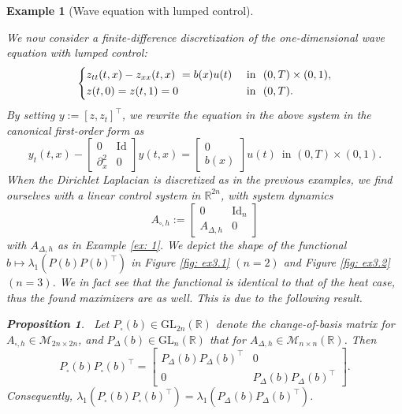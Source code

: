 \documentclass[11pt, a4paper, reqno]{amsart}
\newcommand{\del}{\partial}
\newcommand{\R}{\mathbb{R}}
\theoremstyle{plain}
\numberwithin{equation}{section}
\newtheorem{proposition}{Proposition}[section]
\newtheorem{example}{Example}[section]
\begin{document}
	\begin{example}[Wave equation with lumped control] \label{ex: 3}
	
	We now consider a finite-difference discretization of the one-dimensional wave equation with lumped control: 
	\begin{equation*}
	\begin{dcases}
	z_{tt}(t,x) - z_{xx}(t,x) = b(x)u(t) &\text{ in } (0,T)\times(0,1),\\
	z(t,0) = z(t,1) = 0 &\text{ in } (0,T).
	\end{dcases}	
	\end{equation*}
	By setting $y:=[z, z_t]^\top$, we rewrite the equation in the above system in the canonical first-order form as
	\begin{equation*}
	y_t(t,x) - \begin{bmatrix}0&\mathrm{Id}\\ \del_x^2&0\end{bmatrix}y(t,x) = \begin{bmatrix}0\\b(x)\end{bmatrix} u(t) \, \text{ in } (0,T)\times(0,1).
	\end{equation*}
	When the Dirichlet Laplacian is discretized as in the previous examples, we find ourselves with a linear control system in $\R^{2n}$, with system dynamics
	\begin{equation*}
	A_{\square, h}:= \begin{bmatrix} 0&\mathrm{Id}_n\\
						      A_{\Delta,h}&0
	\end{bmatrix}
	\end{equation*}
	with $A_{\Delta, h}$ as in Example \ref{ex: 1}. We depict the shape of the functional $b\mapsto \lambda_1(P(b)P(b)^\top)$ in Figure \ref{fig: ex3.1} $(n=2)$ and Figure \ref{fig: ex3.2} $(n=3)$. 
	We in fact see that the functional is identical to that of the heat case, thus the found maximizers are as well. This is due to the following result.
	
	\begin{proposition} \label{prop: wave=heat} Let $P_{\square}(b)\in\mathrm{GL}_{2n}(\R)$ denote the change-of-basis matrix for $A_{\square,h}\in\mathcal{M}_{2n\times 2n}$, and $P_{\Delta}(b)\in\mathrm{GL}_n(\R)$ that for $A_{\Delta,h}\in\mathcal{M}_{n\times n}(\R)$. Then 
	\begin{equation}
	P_\square(b)P_\square(b)^\top = \begin{bmatrix} P_{\Delta}(b)P_{\Delta}(b)^\top & 0\\ 0 & P_{\Delta}(b)P_{\Delta}(b)^\top\end{bmatrix}.
	\end{equation}
	Consequently, $\lambda_1\left(P_\square(b)P_\square(b)^\top\right) = \lambda_1\left(P_{\Delta}(b)P_{\Delta}(b)^\top\right)$.
	\end{proposition}
	

\end{example}
\end{document}
